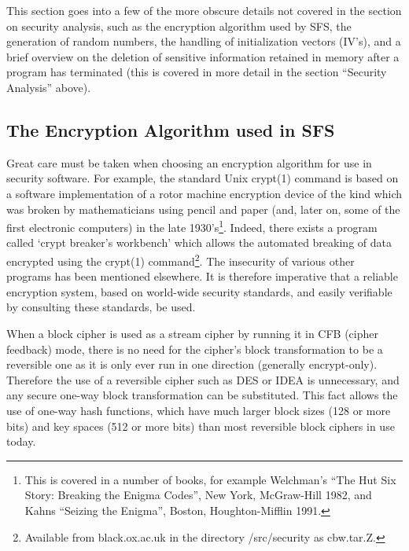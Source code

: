 This section goes into a few of the more obscure details not covered in the
section on security analysis, such as the encryption algorithm used by SFS, the
generation of random numbers, the handling of initialization vectors (IV's),
and a brief overview on the deletion of sensitive information retained in
memory after a program has terminated (this is covered in more detail in the
section ``Security Analysis'' above).


\subsection{The Encryption Algorithm used in SFS}

Great care must be taken when choosing an encryption algorithm for use in
security software.  For example, the standard Unix crypt(1) command is based on
a software implementation of a rotor machine encryption device of the kind
which was broken by mathematicians using pencil and paper (and, later on, some
of the first electronic computers) in the late 1930's\footnote{
		This is covered in a number of books, for example Welchman's ``The
              	Hut Six Story: Breaking the Enigma Codes'', New York, McGraw-Hill
              	1982, and Kahns ``Seizing the Enigma'', Boston, Houghton-Mifflin
              	1991.
}.  Indeed, there exists 
a program called `crypt breaker's workbench' which allows the automated 
breaking of data encrypted using the crypt(1) command\footnote{
		Available from black.ox.ac.uk in the directory /src/security as
              	cbw.tar.Z.
}.  The insecurity of 
various other programs has been mentioned elsewhere.  It is therefore 
imperative that a reliable encryption system, based on world-wide security 
standards, and easily verifiable by consulting these standards, be used.

When a block cipher is used as a stream cipher by running it in CFB (cipher
feedback) mode, there is no need for the cipher's block transformation to be a
reversible one as it is only ever run in one direction (generally
encrypt-only).  Therefore the use of a reversible cipher such as DES or IDEA is
unnecessary, and any secure one-way block transformation can be substituted.
This fact allows the use of one-way hash functions, which have much larger
block sizes (128 or more bits) and key spaces (512 or more bits) than most
reversible block ciphers in use today.

